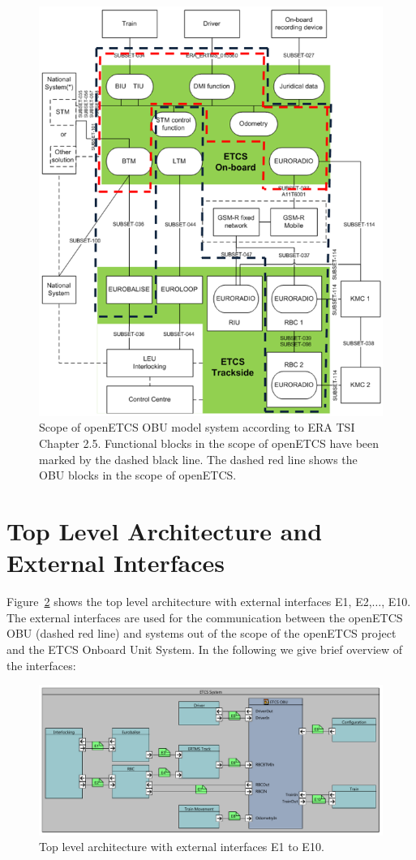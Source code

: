 \documentclass{template/openetcs_report}
\begin{document}
\begin{figure}[H]
\centering
\includegraphics[width=.8\textwidth]{images/ArchitectureSRS}
\caption[Scope of openETCS OBU model system according to ERA TSI Chapter 2.5.]{Scope of openETCS OBU model system according to ERA TSI Chapter 2.5. Functional blocks in the scope of openETCS have been marked by the dashed black line. The dashed red line shows the OBU blocks in the scope of openETCS.}
\label{f:architecture_srs}
\end{figure}


\section{Top Level Architecture and External Interfaces}

Figure~\ref{f:top_level} shows the top level architecture with external interfaces E1, E2,$\ldots$, E10. The external interfaces are used for the communication between the openETCS OBU (dashed red line) and systems out of the scope of the openETCS project and the ETCS Onboard Unit System. In the following we give  brief overview of the interfaces:
\begin{figure}
\centering
\includegraphics[width=\textwidth]{ETCS_system.pdf}
\caption{Top level architecture with external interfaces E1 to E10.}
\label{f:top_level}
\end{figure}
\end{document}
